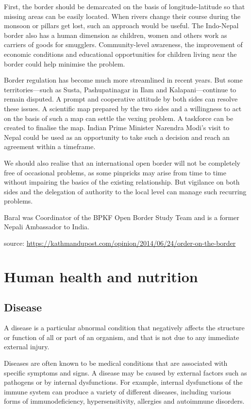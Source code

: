 \documentclass[
  openany]{book}
\begin{document}
First, the border should be demarcated on the basis of longitude-latitude so that missing areas can be easily located. When rivers change their course during the monsoon or pillars get lost, such an approach would be useful. The Indo-Nepal border also has a human dimension as children, women and others work as carriers of goods for smugglers. Community-level awareness, the improvement of economic conditions and educational opportunities for children living near the border could help minimise the problem.

Border regulation has become much more streamlined in recent years. But some territories---such as Susta, Pashupatinagar in Ilam and Kalapani---continue to remain disputed. A prompt and cooperative attitude by both sides can resolve these issues. A scientific map prepared by the two sides and a willingness to act on the basis of such a map can settle the vexing problem. A taskforce can be created to finalise the map. Indian Prime Minister Narendra Modi's visit to Nepal could be used as an opportunity to take such a decision and reach an agreement within a timeframe.

We should also realise that an international open border will not be completely free of occasional problems, as some pinpricks may arise from time to time without impairing the basics of the existing relationship. But vigilance on both sides and the delegation of authority to the local level can manage such recurring problems.

Baral was Coordinator of the BPKF Open Border Study Team and is a former Nepali Ambassador to India.

source: \url{https://kathmandupost.com/opinion/2014/06/24/order-on-the-border}

\hypertarget{human-health-and-nutrition}{%
\chapter{Human health and nutrition}\label{human-health-and-nutrition}}

\hypertarget{disease}{%
\section{Disease}\label{disease}}

A disease is a particular abnormal condition that negatively affects the structure or function of all or part of an organism, and that is not due to any immediate external injury.

Diseases are often known to be medical conditions that are associated with specific symptoms and signs. A disease may be caused by external factors such as pathogens or by internal dysfunctions. For example, internal dysfunctions of the immune system can produce a variety of different diseases, including various forms of immunodeficiency, hypersensitivity, allergies and autoimmune disorders.
\end{document}
